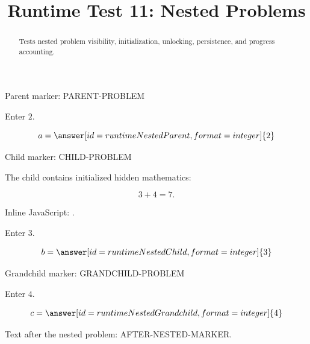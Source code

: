 \documentclass{ximera}
\title{Runtime Test 11: Nested Problems}
\begin{document}
\begin{abstract}
Tests nested problem visibility, initialization, unlocking, persistence,
and progress accounting.
\end{abstract}
\maketitle

\begin{problem}
Parent marker: PARENT-PROBLEM

Enter \(2\).

\[
a=\answer[id=runtimeNestedParent,format=integer]{2}
\]

\begin{problem}
Child marker: CHILD-PROBLEM

The child contains initialized hidden mathematics:

\[
3+4=7.
\]

Inline JavaScript:
.

Enter \(3\).

\[
b=\answer[id=runtimeNestedChild,format=integer]{3}
\]

\begin{problem}
Grandchild marker: GRANDCHILD-PROBLEM

Enter \(4\).

\[
c=\answer[id=runtimeNestedGrandchild,format=integer]{4}
\]
\end{problem}

\end{problem}

Text after the nested problem: AFTER-NESTED-MARKER.

\end{problem}
\end{document}
